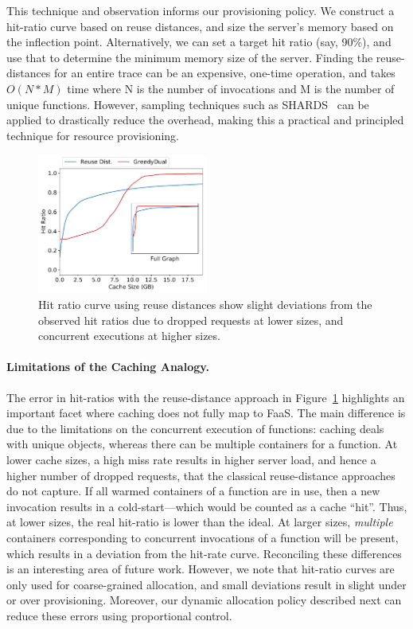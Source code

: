 This technique and observation informs our provisioning policy.
We construct a hit-ratio curve based on reuse distances, and size the server's memory based on the inflection point.
Alternatively, we can set a target hit ratio (say, 90\%), and use that to determine the minimum memory size of the server. 
%
Finding the reuse-distances for an entire trace can be an expensive, one-time operation, and takes $O(N*M)$ time where N is the number of invocations and M is the number of unique functions. 
However, sampling techniques such as SHARDS~\cite{shards} can be applied to drastically reduce the overhead, making this a practical and principled technique for resource provisioning. 



\begin{figure}[t]
  \centering
  \includegraphics[width=0.5\textwidth]{faascache/faas-keepalive-20/graphs/rep-funcs-392/hit-ratio-392-b.pdf}
  \caption{Hit ratio curve using reuse distances show slight deviations from the observed hit ratios due to dropped requests at lower sizes, and concurrent executions at higher sizes.}
  \label{fig:hrc}
\end{figure}

\paragraph{Limitations of the Caching Analogy.}
The error in hit-ratios with the reuse-distance approach in Figure~\ref{fig:hrc} highlights an important facet where caching does not fully map to FaaS.
The main difference is due to the limitations on the concurrent execution of functions: 
caching deals with unique objects, whereas there can be  multiple containers for a function. 
%
At lower cache sizes, a high miss rate results in higher server load, and hence a higher number of dropped requests, that the classical reuse-distance approaches do not capture.
If all warmed containers of a function are in use, then a new invocation results in a cold-start---which would be counted as a cache ``hit''.
Thus, at lower sizes, the real hit-ratio is lower than the ideal. 
At larger sizes, \emph{multiple} containers corresponding to concurrent invocations of a function will be present, which results in a deviation from the hit-rate curve. 
Reconciling these differences is an interesting area of future work. %
However, we note that hit-ratio curves are only used for coarse-grained allocation, and small deviations result in slight under or over provisioning. 
Moreover, our dynamic allocation policy described next can reduce these errors using proportional control. 

